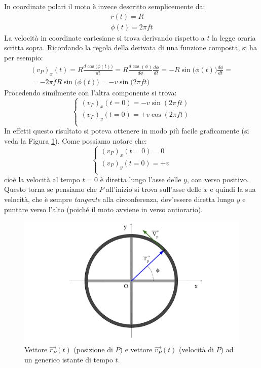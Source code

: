 \documentclass[12pt,a4paper]{book}
\begin{document}
%
In coordinate polari il moto è invece descritto semplicemente da: 
%
\begin{gather*}
r(t)=R \\
\phi(t) = 2 \pi f t
\end{gather*}
%
La velocità in coordinate cartesiane si trova derivando rispetto a $t$ la legge oraria scritta sopra. Ricordando la regola della derivata di una funzione composta, si ha per esempio:
%
\begin{gather*}
(v_P)_x(t)= R \frac{d \cos \big(\phi(t)\big)}{dt} = R \frac{d \cos (\phi)}{d\phi} \frac{d \phi}{dt}= -R \sin \big(\phi(t) \big) \frac{d \phi}{dt}  = \\
= -2 \pi f R \sin \big(\phi(t)\big) = - v \sin \big(2 \pi f t \big)
\end{gather*} 
%
Procedendo similmente con l'altra componente si trova:
% 
\begin{equation*}
 \left\{\begin{array}{lr}
  (v_P)_x(t=0)= - v \sin(2 \pi f t) \\
  (v_P)_y(t=0)= + v \cos(2 \pi f t) \\
        \end{array}\right.
\end{equation*}
%
In effetti questo risultato si poteva ottenere in modo più 
facile graficamente (si veda la Figura \ref{fig:ruota vec}). Come  possiamo notare che:
%
\begin{equation*}
 \left\{\begin{array}{lr}
  (v_P)_x(t=0)= 0\\
  (v_P)_y(t=0)= + v\\
        \end{array}\right.
\end{equation*}
% 
cioè la velocità al tempo $t=0$ è diretta lungo l'asse delle $y$, con verso positivo. Questo torna se pensiamo che $P$ all'inizio si trova sull'asse delle $x$ e quindi la sua velocità, che è sempre \textit{tangente} alla circonferenza, dev'essere diretta lungo $y$ e puntare verso l'alto (poiché il moto avviene in verso antiorario). 

 \begin{figure}[!ht]
 \centering
\includegraphics[scale=0.45]{ruota2.pdf}
\caption{Vettore $\vec{r_P}(t)$ (posizione di $P$) e vettore $\vec{v_P}(t)$ (velocità di $P$) ad un generico istante di tempo $t$. \label{fig:ruota vec} }
\end{figure}
\end{document}
